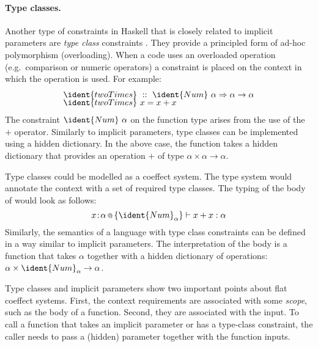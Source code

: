 \paragraph{Type classes.}
Another type of constraints in Haskell that is closely related to implicit parameters are 
\emph{type class} constraints \cite{app-type-classes}. They provide a principled form of ad-hoc
polymorphism (overloading). When a code uses an overloaded operation (e.g.~comparison or numeric 
operators) a constraint is placed on the context in which the operation is used. For example:
%
\begin{equation*}
\begin{array}{l}
\ident{twoTimes}~::~\ident{Num}~\alpha \Rightarrow \alpha \rightarrow \alpha \\[-0.25em]
\ident{twoTimes}~x=x+x
\end{array}
\end{equation*}
%
The constraint $\ident{Num}~\alpha$ on the function type arises from the use of the $+$ operator. 
Similarly to implicit parameters, type classes can be implemented using a hidden dictionary. In 
the above case, the function  takes a hidden dictionary that provides an operation
$+$ of type $\alpha \times \alpha \rightarrow \alpha$.

Type classes could be modelled as a coeffect system. The type system would annotate the context
with a set of required type classes. The typing of the body of  would look as 
follows:
%
\begin{equation*}
\coctx{x\!:\!\alpha}{ \{ \ident{Num}_\alpha \} } \vdash x + x : \alpha
\end{equation*}
%
Similarly, the semantics of a language with type class constraints can be defined in a way
similar to implicit parameters. The interpretation of the body is a function that takes $\alpha$
together with a hidden dictionary of operations: $\alpha \times \ident{Num}_\alpha \rightarrow \alpha$.

Type classes and implicit parameters show two important points about flat coeffect systems.
First, the context requirements are associated with some \emph{scope}, such as the body
of a function. Second, they are associated with the input. To call a function that takes an 
implicit parameter or has a type-class constraint, the caller needs to pass a (hidden) parameter
together with the function inputs.


